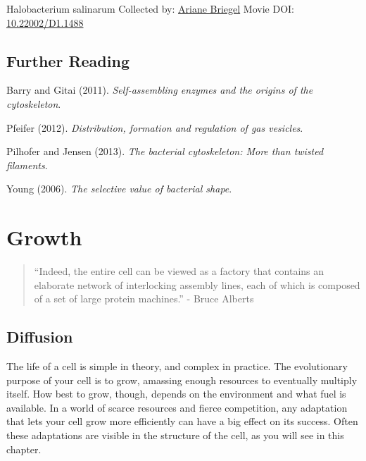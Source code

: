 \documentclass[]{tufte-book}
\begin{document}
\hypertarget{htmlwidget-fb2477ce388ed7e46182}{}

\label{fig:3-7a}Halobacterium salinarum Collected by: \protect\hyperlink{ariane_briegel}{Ariane Briegel} Movie DOI: \href{https://doi.org/10.22002/D1.1488}{10.22002/D1.1488}

\hypertarget{further-reading-2}{%
\section{Further Reading}\label{further-reading-2}}

Barry and Gitai (2011). \emph{Self-assembling enzymes and the origins of the cytoskeleton}.\citep{barry2011}

Pfeifer (2012). \emph{Distribution, formation and regulation of gas vesicles}.\citep{pfeifer2012}

Pilhofer and Jensen (2013). \emph{The bacterial cytoskeleton: More than twisted filaments}.\citep{pilhofer2013}

Young (2006). \emph{The selective value of bacterial shape}.\citep{young2006}

\hypertarget{growth}{%
\chapter{Growth}\label{growth}}

\begin{quote}
``Indeed, the entire cell can be viewed as a factory that contains an elaborate network of interlocking assembly lines, each of which is composed of a set of large protein machines.''
- Bruce Alberts \citep{alberts1998}
\end{quote}

\hypertarget{diffusion}{%
\section{Diffusion}\label{diffusion}}

The life of a cell is simple in theory, and complex in practice. The evolutionary purpose of your cell is to grow, amassing enough resources to eventually multiply itself. How best to grow, though, depends on the environment and what fuel is available. In a world of scarce resources and fierce competition, any adaptation that lets your cell grow more efficiently can have a big effect on its success. Often these adaptations are visible in the structure of the cell, as you will see in this chapter.
\end{document}
